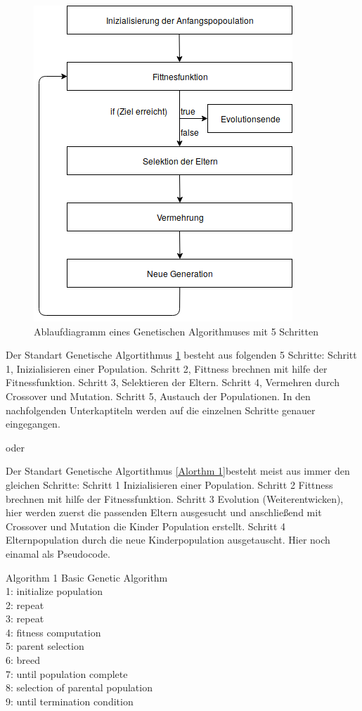 \noindent%
\begin{figure}[H]
  \centering  
  \includegraphics[scale=0.5]{img/Ablauf_kurz.png}
  \caption{Ablaufdiagramm eines Genetischen Algorithmuses mit 5 Schritten}
  \label{fig:Ablauf_kurz}
\end{figure}

Der Standart Genetische Algortithmus \ref{fig:Ablauf_kurz} besteht aus folgenden 5 Schritte:
Schritt 1, Inizialisieren einer Population.
Schritt 2, Fittness brechnen mit hilfe der Fitnessfunktion.
Schritt 3, Selektieren der Eltern.
Schritt 4, Vermehren durch Crossover und Mutation.
Schritt 5, Austauch der Populationen.
In den nachfolgenden Unterkaptiteln werden auf die einzelnen Schritte genauer eingegangen.

\iffalse
oder 

Der Standart Genetische Algortithmus \ref{Alorthm 1}besteht meist aus immer den gleichen Schritte:
Schritt 1 Inizialisieren einer Population.
Schritt 2 Fittness brechnen mit hilfe der Fitnessfunktion.
Schritt 3 Evolution (Weiterentwicken), hier werden zuerst die passenden Eltern ausgesucht und anschließend mit Crossover und Mutation die Kinder Population erstellt. 
Schritt 4 Elternpopulation durch die neue Kinderpopulation ausgetauscht.
Hier noch einamal als Pseudocode.


Algorithm 1 Basic Genetic Algorithm \\
1: initialize population \\
2: repeat \\
3: 		repeat \\
4:			fitness computation \\
5:			parent selection \\
6:			breed \\
7:		until population complete \\
8:		selection of parental population \\
9: until termination condition \\

